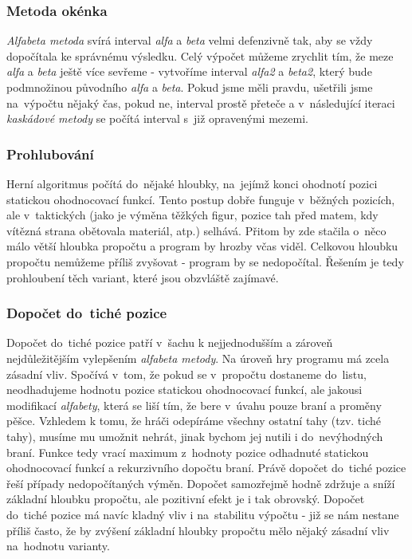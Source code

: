 \documentclass[11pt, titlepage]{article}
\begin{document}
\subsubsection{Metoda okénka}

{\it Alfabeta metoda} svírá interval {\it alfa} a {\it beta} velmi defenzivně tak, aby se vždy dopočítala ke správnému výsledku. Celý výpočet můžeme zrychlit tím, že meze {\it alfa} a {\it beta} ještě více sevřeme - vytvoříme interval {\it alfa2} a {\it beta2}, který bude podmnožinou původního {\it alfa} a {\it beta}. Pokud jsme měli pravdu, ušetřili jsme na~výpočtu nějaký čas, pokud ne, interval prostě přeteče a v~následující iteraci {\it kaskádové metody} se počítá interval s~již opravenými mezemi.

\subsubsection{Prohlubování}

Herní algoritmus počítá do~nějaké hloubky, na~jejímž konci ohodnotí pozici statickou ohodnocovací funkcí. Tento postup dobře funguje v~běžných pozicích, ale v~taktických (jako je výměna těžkých figur, pozice tah před matem, kdy vítězná strana obětovala materiál, atp.) selhává. Přitom by zde stačila o~něco málo větší hloubka propočtu a program by hrozby včas viděl. Celkovou hloubku propočtu nemůžeme příliš zvyšovat - program by se nedopočítal. Řešením je tedy prohloubení těch variant, které jsou obzvláště zajímavé.

\subsubsection{Dopočet do~tiché pozice}

Dopočet do~tiché pozice patří v~šachu k nejjednodušším a zároveň nejdůležitějším vylepšením {\it alfabeta metody}. Na úroveň hry programu má zcela zásadní vliv. Spočívá v~tom, že pokud se v~propočtu dostaneme do~listu, neodhadujeme hodnotu pozice statickou ohodnocovací funkcí, ale jakousi modifikací {\it alfabety}, která se liší tím, že bere v~úvahu pouze braní a proměny pěšce. Vzhledem k tomu, že hráči odepíráme všechny ostatní tahy (tzv. tiché tahy), musíme mu umožnit nehrát, jinak bychom jej nutili i do~nevýhodných braní. Funkce tedy vrací maximum z~hodnoty pozice odhadnuté statickou ohodnocovací funkcí a rekurzivního dopočtu braní. Právě dopočet do~tiché pozice řeší případy nedopočítaných výměn. Dopočet samozřejmě hodně zdržuje a sníží základní hloubku propočtu, ale pozitivní efekt je i tak obrovský. Dopočet do~tiché pozice má navíc kladný vliv i na~stabilitu výpočtu - již se nám nestane příliš často, že by zvýšení základní hloubky propočtu mělo nějaký zásadní vliv na~hodnotu varianty.
\end{document}
